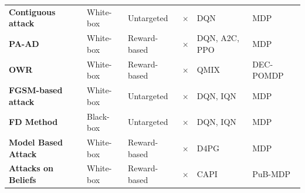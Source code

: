 \documentclass[conference,compsoc]{IEEEtran}
\begin{document}
\begin{table}
\begin{tabulary}{1.0\textwidth}{Lp{2cm}llLl}
\textbf{Contiguous attack \cite{behzadan_whatever_2017}}                                              & White-box                       & Untargeted                  & $\times$                       & DQN                        & MDP             \\ 
\textbf{PA-AD  \cite{sun_who_2021}}                      & White-box                       & Reward-based         & $\times$                       & DQN, A2C, PPO              & MDP             \\ 
\textbf{OWR \cite{lin_robustness_2020}} & White-box                       & Reward-based         & $\times$                       & QMIX                       & DEC-POMDP       \\ 
\textbf{FGSM-based attack \cite{wang_adversarial_2020}}                                                           & White-box                       & Untargeted                  & $\times$                       & DQN, IQN                   & MDP             \\ 
\textbf{FD Method\cite{wang_adversarial_2020}}                                                      & Black-box                       & Untargeted                  & $\times$                       & DQN, IQN                   & MDP             \\ 
\textbf{Model Based Attack \cite{weng_toward_2020}}                                             & White-box                       & Reward-based         & $\times$                       & D4PG                       & MDP             \\
\textbf{Attacks on Beliefs \cite{fujimoto_adversarial_2021}} & White-box & Reward-based & $\times$ & CAPI & PuB-MDP \\
\hline
\end{tabulary}
\label{tab:evasion_att}
\end{table}
\end{document}
